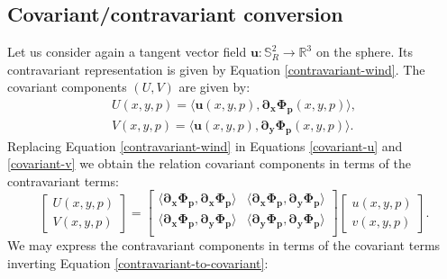 \subsection{Covariant/contravariant conversion}
\label{anexo-cov-con}
Let us consider again a tangent vector field $\boldsymbol{u}: \mathbb{S}^2_R \to 
\mathbb{R}^3$ on the sphere. Its contravariant representation 
is given by Equation \eqref{contravariant-wind}.
The covariant components $(U,V)$ are given by:
\begin{align}
	\label{covariant-u}
	U(x,y,p) = \langle \boldsymbol{u}(x,y,p) , \boldsymbol{\partial_x \Phi_p}(x,y,p)  \rangle, \\
	\label{covariant-v}
	V(x,y,p) = \langle \boldsymbol{u}(x,y,p) , \boldsymbol{\partial_y \Phi_p}(x,y,p)  \rangle.
\end{align}
Replacing Equation \eqref{contravariant-wind} in 
Equations \eqref{covariant-u} and \eqref{covariant-v} we obtain
the relation covariant components in terms of the
contravariant terms:
\begin{equation}
	\label{contravariant-to-covariant}
	\begin{bmatrix}
		{U}(x,y,p) \\
		{V}(x,y,p)
	\end{bmatrix}
	=
	\begin{bmatrix}
		\langle \boldsymbol{\partial_x \Phi_p}, \boldsymbol{\partial_x \Phi_p} \rangle
		& \langle \boldsymbol{\partial_x \Phi_p}, \boldsymbol{\partial_y \Phi_p} \rangle \\
		\langle \boldsymbol{\partial_x \Phi_p}, \boldsymbol{\partial_y \Phi_p} \rangle 
		& \langle \boldsymbol{\partial_y \Phi_p}, \boldsymbol{\partial_y \Phi_p} \rangle \\
	\end{bmatrix}
	\begin{bmatrix}
		{u} (x,y,p) \\
		{v} (x,y,p) 
	\end{bmatrix}.
\end{equation}
We may express the contravariant components in terms of 
the covariant terms inverting Equation \eqref{contravariant-to-covariant}:
